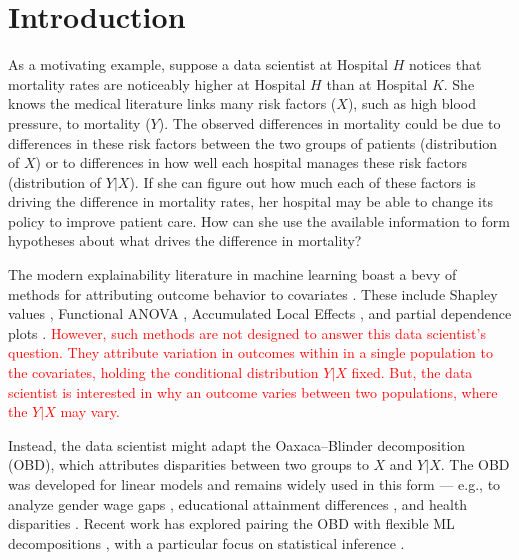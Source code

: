 \section{Introduction}
As a motivating example, suppose a data scientist at Hospital $H$ notices that mortality rates are noticeably higher at Hospital $H$ than at Hospital $K$.
She knows the medical literature links many risk factors ($X$), such as high blood pressure, to mortality ($Y$).
The observed differences in mortality could be due to differences in these risk factors between the two groups of patients (distribution of $X$) or to differences in how well each hospital manages these risk factors (distribution of $Y|X$).
If she can figure out how much each of these factors is driving the difference in mortality rates, her hospital may be able to change its policy to improve patient care.
How can she use the available information to form hypotheses about what drives the difference in mortality?

The modern explainability literature in machine learning boast a bevy of methods for attributing outcome behavior to covariates \citep{Dwivedi2023}.
These include Shapley values \citep{Shapley1953, Lundberg2017, chen2025shapley}, Functional ANOVA \citep{stone1994, hooker2004discovering, hookerGeneralizedFunctionalANOVA2007, lengerich2020purifying, fumagalli2025fanova}, Accumulated Local Effects \citep{apley2020}, and partial dependence plots \citep{friedman2001greedy, liu2025trees}.
\textcolor{red}{However, such methods are not designed to answer this data scientist's question.
They attribute variation in outcomes within in a single population to the covariates, holding the conditional distribution $Y|X$ fixed. 
But, the data scientist is interested in why an outcome varies between two populations, where the $Y|X$ may vary.}

Instead, the data scientist might adapt the Oaxaca--Blinder decomposition (OBD), which attributes disparities between two groups to $X$ and $Y|X$. 
The OBD was developed for linear models \citep{oaxaca1973,blinder1973} and remains widely used in this form --- e.g., to analyze gender wage gaps \citep{paradaContzen2025}, educational attainment differences \citep{barhaim2023}, and health disparities \citep{cartwright2021}. 
Recent work has explored pairing the OBD with flexible ML decompositions \citep{quintero2025}, with a particular focus on statistical inference \citep{bach2024heterogeneity,quintas2024multiply,flachaire2025decomposing}.

